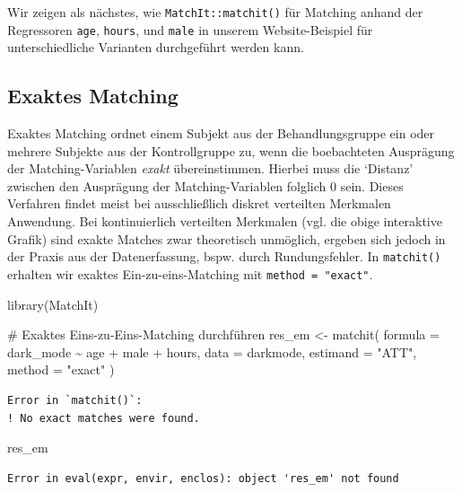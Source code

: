 \documentclass[
  a4paper,
  DIV=11,
  oneside]{scrreprt}
\newenvironment{Shaded}{\begin{snugshade}}{\end{snugshade}}
\newcommand{\AttributeTok}[1]{\textcolor[rgb]{0.40,0.45,0.13}{#1}}
\newcommand{\CommentTok}[1]{\textcolor[rgb]{0.37,0.37,0.37}{#1}}
\newcommand{\FunctionTok}[1]{\textcolor[rgb]{0.28,0.35,0.67}{#1}}
\newcommand{\NormalTok}[1]{\textcolor[rgb]{0.00,0.23,0.31}{#1}}
\newcommand{\OtherTok}[1]{\textcolor[rgb]{0.00,0.23,0.31}{#1}}
\newcommand{\SpecialCharTok}[1]{\textcolor[rgb]{0.37,0.37,0.37}{#1}}
\newcommand{\StringTok}[1]{\textcolor[rgb]{0.13,0.47,0.30}{#1}}
\begin{document}
Wir zeigen als nächstes, wie \texttt{MatchIt::matchit()} für Matching
anhand der Regressoren \texttt{age}, \texttt{hours}, und \texttt{male}
in unserem Website-Beispiel für unterschiedliche Varianten durchgeführt
werden kann.

\subsection{Exaktes Matching}\label{exaktes-matching}

Exaktes Matching ordnet einem Subjekt aus der Behandlungsgruppe ein oder
mehrere Subjekte aus der Kontrollgruppe zu, wenn die boebachteten
Ausprägung der Matching-Variablen \emph{exakt} übereinstimmen. Hierbei
muss die `Distanz' zwischen den Ausprägung der Matching-Variablen
folglich \(0\) sein. Dieses Verfahren findet meist bei ausschließlich
diskret verteilten Merkmalen Anwendung. Bei kontinuierlich verteilten
Merkmalen (vgl. die obige interaktive Grafik) sind exakte Matches zwar
theoretisch unmöglich, ergeben sich jedoch in der Praxis aus der
Datenerfassung, bspw. durch Rundungsfehler. In \texttt{matchit()}
erhalten wir exaktes Ein-zu-eins-Matching mit
\texttt{method\ =\ "exact"}.

\begin{Shaded}
\begin{Highlighting}[]
\FunctionTok{library}\NormalTok{(MatchIt)}

\CommentTok{\# Exaktes Eins{-}zu{-}Eins{-}Matching durchführen}
\NormalTok{res\_em }\OtherTok{\textless{}{-}} \FunctionTok{matchit}\NormalTok{(}
  \AttributeTok{formula =}\NormalTok{ dark\_mode }\SpecialCharTok{\textasciitilde{}}\NormalTok{ age }\SpecialCharTok{+}\NormalTok{ male }\SpecialCharTok{+}\NormalTok{ hours, }
  \AttributeTok{data =}\NormalTok{ darkmode,}
  \AttributeTok{estimand =} \StringTok{"ATT"}\NormalTok{,}
  \AttributeTok{method =} \StringTok{"exact"}
\NormalTok{)}
\end{Highlighting}
\end{Shaded}

\begin{verbatim}
Error in `matchit()`:
! No exact matches were found.
\end{verbatim}

\begin{Shaded}
\begin{Highlighting}[]
\NormalTok{res\_em}
\end{Highlighting}
\end{Shaded}

\begin{verbatim}
Error in eval(expr, envir, enclos): object 'res_em' not found
\end{verbatim}
\end{document}
